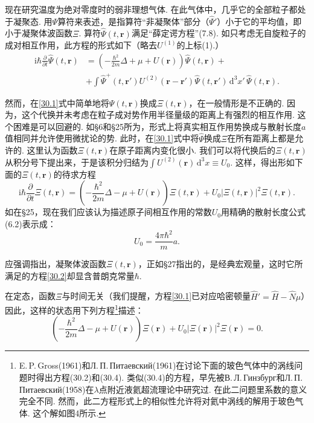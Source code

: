 现在研究温度为绝对零度时的弱非理想气体. 在此气体中，几乎它的全部粒子都处于凝聚态. 用$\Psi$算符来表述，是指算符“非凝聚体”部分（$\hat{\Psi}'$）小于它的平均值，即小于凝聚体波函数$\Xi$. 算符$\hat{\Psi}(t,\bm{r})$满足“薛定谔方程”(7.8). 如只考虑无自旋粒子的成对相互作用，此方程的形式如下（略去$U^{(1)}$的上标(1).）
\begin{equation}
\begin{aligned}
\mathrm{i}\hbar\frac{\partial}{\partial t}\hat{\Psi}(t,\bm{r})
&=\left(-\frac{\hbar^{2}}{2m}\Delta+\mu+U(\bm{r})\right)\hat{\Psi}(t,\bm{r})+{}\\
&+\int\hat{\Psi}^{+}(t,\bm{r}')U^{(2)}(\bm{r}-\bm{r}')\hat{\Psi}(t,\bm{r}')\,\mathrm{d}^{3}x'\,\hat{\Psi}(t,\bm{r}).
\end{aligned}
\label{30.1}
\end{equation}

然而，在\eqref{30.1}式中简单地将$\Psi(t,\bm{r})$换成$\Xi(t,\bm{r})$，在一般情形是不正确的. 因为，这个代换并未考虑在粒子成对势作用半径量级的距离上有强烈的相互作用. 这个困难是可以回避的. 如§6和§25所为，形式上将真实相互作用势换成与散射长度$a$值相同并允许使用微扰论的势. 此时，在\eqref{30.1}式中将$\hat{\Psi}$换成$\Xi$在所有距离上都是允许的. 这里认为函数$\Xi(t,\bm{r})$在原子距离内变化很小. 我们可以将代换后的$\Xi(t,\bm{r})$从积分号下提出来，于是该积分归结为$\int U^{(2)}(\bm{r})\,\mathrm{d}^{3}x\equiv U_{0}$. 这样，得出形如下面的$\Xi(t,\bm{r})$的待求方程
\begin{equation}
\mathrm{i}\hbar\frac{\partial}{\partial t}\Xi(t,\bm{r})
=\left(-\frac{\hbar^{2}}{2m}\Delta-\mu+U(\bm{r})\right)\Xi(t,\bm{r})
+U_{0}|\Xi(t,\bm{r})|^{2}\Xi(t,\bm{r}).
\label{30.2}
\end{equation}
如在§25，现在我们应该认为描述原子间相互作用的常数$U_{0}$用精确的散射长度公式(6.2)表示成：
\begin{equation}
U_{0}=\frac{4\pi\hbar^{2}}{m}a.
\label{30.3}
\end{equation}

应强调指出，凝聚体波函数$\Xi(t,\bm{r})$，正如§27指出的，是经典宏观量，这时它所满足的方程\eqref{30.2}却显含普朗克常量$\hbar$.

在定态，函数$\Xi$与时间无关（我们提醒，方程\eqref{30.1}已对应哈密顿量$\hat{H}'=\hat{H}-\hat{N}\mu$）因此，这样的状态用下列方程\footnote{E.\,P.\,Gross(1961)和Л.\,П.\,Питаевский(1961)在讨论下面的玻色气体中的涡线问题时得出方程(30.2)和(30.4). 类似(30.4)的方程，早先被В.\,Л.\,Гинзбург和Л.\,П.\,Питаевский(1958)在$\lambda$点附近液氦超流理论中研究过. 在此二问题里系数的意义完全不同. 然而，此二方程形式上的相似性允许将对氦中涡线的解用于玻色气体. 这个解如图4所示.}描述：
\begin{equation}
\left(-\frac{\hbar^{2}}{2m}\Delta-\mu+U(\bm{r})\right)\Xi(\bm{r})
+U_{0}|\Xi(\bm{r})|^{2}\Xi(\bm{r})=0.
\label{30.4}
\end{equation}

